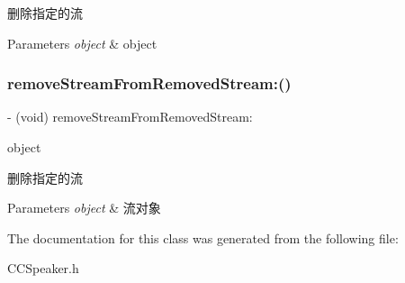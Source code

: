 删除指定的流 
\begin{DoxyParams}{Parameters}
{\em object} & object \\
\hline
\end{DoxyParams}
\mbox{\label{interface_c_c_speaker_a6d2ff7ef65cf4bb27aaea04abdcea892}} 
\subsubsection{\texorpdfstring{remove\+Stream\+From\+Removed\+Stream\+:()}{removeStreamFromRemovedStream:()}}
{\footnotesize\ttfamily -\/ (void) remove\+Stream\+From\+Removed\+Stream\+: \begin{DoxyParamCaption}\item[{(\hyperlink{interface_c_c_stream}{C\+C\+Stream} $\ast$)}]{object }\end{DoxyParamCaption}}

删除指定的流 
\begin{DoxyParams}{Parameters}
{\em object} & 流对象 \\
\hline
\end{DoxyParams}


The documentation for this class was generated from the following file\+:\begin{DoxyCompactItemize}
\item 
C\+C\+Speaker.\+h\end{DoxyCompactItemize}
